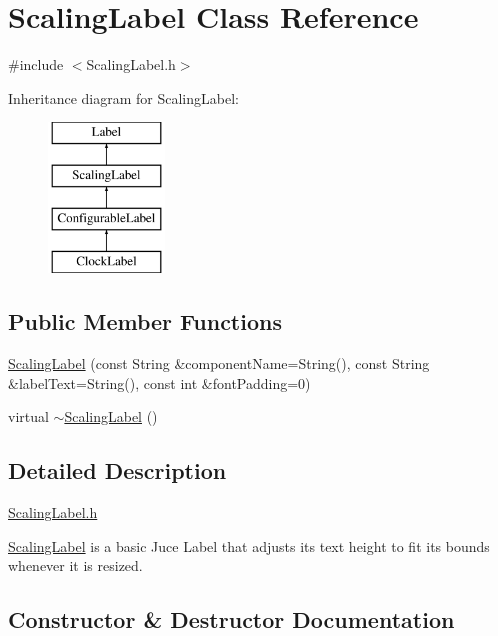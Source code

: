 \hypertarget{classScalingLabel}{}\section{Scaling\+Label Class Reference}
\label{classScalingLabel}


{\ttfamily \#include $<$Scaling\+Label.\+h$>$}

Inheritance diagram for Scaling\+Label\+:\begin{figure}[H]
\begin{center}
\leavevmode
\includegraphics[height=4.000000cm]{classScalingLabel}
\end{center}
\end{figure}
\subsection*{Public Member Functions}
\begin{DoxyCompactItemize}
\item 
\mbox{\hyperlink{classScalingLabel_a715bc16761f839385cb3420decc5c811}{Scaling\+Label}} (const String \&component\+Name=String(), const String \&label\+Text=String(), const int \&font\+Padding=0)
\item 
virtual \mbox{\hyperlink{classScalingLabel_a1dd11d056f649ded847cad8adef64f51}{$\sim$\+Scaling\+Label}} ()
\end{DoxyCompactItemize}


\subsection{Detailed Description}
\mbox{\hyperlink{ScalingLabel_8h}{Scaling\+Label.\+h}}

\mbox{\hyperlink{classScalingLabel}{Scaling\+Label}} is a basic Juce Label that adjusts its text height to fit its bounds whenever it is resized. 

\subsection{Constructor \& Destructor Documentation}
\mbox{\label{classScalingLabel_a715bc16761f839385cb3420decc5c811}} 
